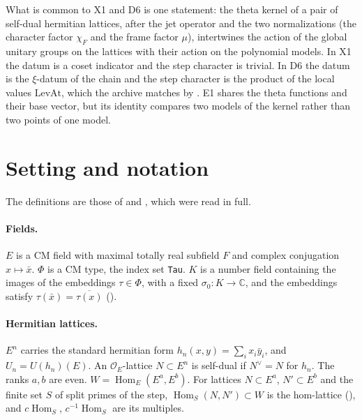 \documentclass[11pt]{article}
\newcommand{\Hom}{\operatorname{Hom}}
\newcommand{\OEr}{\mathcal O_E}
\theoremstyle{definition}
\theoremstyle{remark}
\begin{document}
\noindent What is common to X1 and D6 is one statement: the theta kernel of a pair of self-dual hermitian lattices, after the jet operator and the two normalizations (the character factor $\chi_F$ and the frame factor $\mu$), intertwines the action of the global unitary groups on the lattices with their action on the polynomial models. In X1 the datum is a coset indicator and the step character is trivial. In D6 the datum is the $\xi$-datum of the chain and the step character is the product of the local values $\mathrm{LevAt}$, which the archive matches by . E1 shares the theta functions and their base vector, but its identity compares two models of the kernel rather than two points of one model.

\section{Setting and notation}\label{sec:set}

The definitions are those of  and , which were read in full.

\paragraph{Fields.} $E$ is a CM field with maximal totally real subfield $F$ and complex conjugation $x\mapsto\bar x$. $\Phi$ is a CM type, the index set \texttt{Tau}. $K$ is a number field containing the images of the embeddings $\tau\in\Phi$, with a fixed $\sigma_0\colon K\to\mathbb C$, and the embeddings satisfy $\tau(\bar x)=\overline{\tau(x)}$ ().

\paragraph{Hermitian lattices.} $E^n$ carries the standard hermitian form $h_n(x,y)=\sum_i x_i\bar y_i$, and $U_n=U(h_n)(E)$. An $\OEr$-lattice $N\subset E^n$ is self-dual if $N^\vee=N$ for $h_n$. The ranks $a,b$ are even. $W=\Hom_E(E^a,E^b)$. For lattices $N\subset E^a$, $N'\subset E^b$ and the finite set $S$ of split primes of the step, $\Hom_S(N,N')\subset W$ is the hom-lattice (), and $c\Hom_S$, $c^{-1}\Hom_S$ are its multiples.
\end{document}
